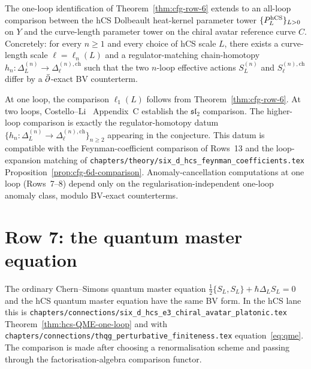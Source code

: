 \begin{conjecture}
\label{conj:cfg-row-6-all-loop}
The one-loop identification of Theorem~\ref{thm:cfg-row-6} extends to
an all-loop comparison between the hCS Dolbeault heat-kernel parameter
tower $\{P_L^{\mathrm{hCS}}\}_{L>0}$ on $Y$ and the curve-length parameter
tower on the chiral avatar reference curve $C$. Concretely: for every
$n\geq 1$ and every choice of hCS scale $L$, there exists a curve-length scale
$\ell = \ell_n(L)$ and a regulator-matching chain-homotopy
$h_n\colon\Delta_L^{(n)}\to\Delta_\ell^{(n),\mathrm{ch}}$ such that
the two $n$-loop effective actions $S_L^{(n)}$ and $S_\ell^{(n),\mathrm{ch}}$
differ by a $\bar\partial$-exact BV counterterm.
\end{conjecture}

\begin{remark}
\label{rem:cfg-row-6-scope}
At one loop, the comparison $\ell_1(L)$ follows from
Theorem~\ref{thm:cfg-row-6}. At two loops,
Costello--Li~\cite{CostelloLi2020} Appendix~C establish the
$\mathfrak{sl}_2$ comparison. The higher-loop comparison is exactly
the regulator-homotopy datum
$\{h_n\colon\Delta_L^{(n)}\to\Delta_\ell^{(n),\mathrm{ch}}\}_{n\ge 2}$
appearing in the conjecture. This datum is compatible with the
Feynman-coefficient comparison of Rows~13 and the loop-expansion matching of
\texttt{chapters/theory/six\_d\_hcs\_feynman\_coefficients.tex}
Proposition~\ref{prop:cfg-6d-comparison}. Anomaly-cancellation
computations at one loop (Rows~7--8) depend only on the
regularisation-independent one-loop anomaly class, modulo BV-exact
counterterms.
\end{remark}

\section{Row 7: the quantum master equation}
\label{sec:cfg-row-7-qme}

\begin{theorem}
\label{thm:cfg-row-7}
The ordinary Chern--Simons quantum master equation
$\tfrac12\{S_L,S_L\} + \hbar\Delta_L S_L = 0$ and the hCS quantum master
equation have the same BV form. In the hCS lane this is
\texttt{chapters/connections/six\_d\_hcs\_e3\_chiral\_avatar\_platonic.tex}
Theorem~\ref{thm:hcs-QME-one-loop} and with
\texttt{chapters/connections/thqg\_perturbative\_finiteness.tex}
equation~\eqref{eq:qme}. The comparison is made after choosing a
renormalisation scheme and passing through the factorisation-algebra
comparison functor.
\end{theorem}

